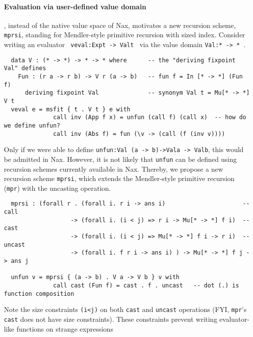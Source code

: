 \documentclass[a4paper]{easychair} %
\newcommand{\mprsi}[0]{\texttt{mprsi}}
\begin{document}
\paragraph{Evaluation via user-defined value domain\!\!\!\!\!}, instead of
the native value space of Nax, motivates a new recursion scheme,
\mprsi, standing for Mendler-style primitive recursion with sized index.
Consider writing an evaluator \texttt{\,veval\;:\;Exp\;t\,->\,Val\;t\,}
via the value domain \texttt{Val\;:\;*\,->\,*\,}.\vspace*{-1ex}
{\small
\begin{verbatim}
  data V : (* -> *) -> * -> * where      -- the "deriving fixpoint Val" defines
    Fun : (r a -> r b) -> V r (a -> b)   -- fun f = In [* -> *] (Fun f)
      deriving fixpoint Val              -- synonym Val t = Mu[* -> *] V t
  veval e = msfit { t . V t } e with
              call inv (App f x) = unfun (call f) (call x)  -- how do we define unfun?
              call inv (Abs f) = fun (\v -> (call (f (inv v))))
\end{verbatim} }
\noindent
Only if we were able to define
\texttt{unfun\;:\;Val\,(a\,->\,b)\;->\;Val\;a\,->\,Val\;b},
this would be admitted in Nax.
However, it is not likely that \texttt{unfun} can be defined using
recursion schemes currently available in Nax. Thereby, we propose
a new recursion scheme \mprsi, which extends the Mendler-style primitive recursion
(\texttt{mpr}) with the uncasting operation.\vspace*{-.5ex}
{\small
\begin{verbatim}
  mprsi : (forall r . (forall i. r i -> ans i)                      -- call
                   -> (forall i. (i < j) => r i -> Mu[* -> *] f i)  -- cast   
                   -> (forall i. (i < j) => Mu[* -> *] f i -> r i)  -- uncast 
                   -> (forall i. f r i -> ans i) ) -> Mu[* -> *] f j -> ans j

  unfun v = mprsi { (a -> b) . V a -> V b } v with
              call cast (Fun f) = cast . f . uncast   -- dot (.) is function composition
\end{verbatim} }\vspace*{-.5ex}
\noindent
Note the size constraints \texttt{(i\;<\;j)} on both \texttt{cast} and \texttt{uncast} operations
(FYI, \texttt{mpr}'s \texttt{cast} does not have size constraints).
These constraints prevent writing evaluator-like functions on strange expressions
\end{document}
